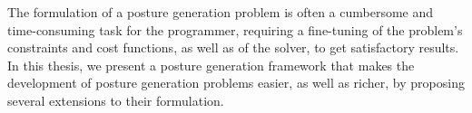 The formulation of a posture generation problem is often a cumbersome and time-consuming task for the programmer, requiring a fine-tuning of the problem's constraints and cost functions, as well as of the solver, to get satisfactory results.
In this thesis, we present a posture generation framework that makes the development of posture generation problems easier, as well as richer, by proposing several extensions to their formulation.







